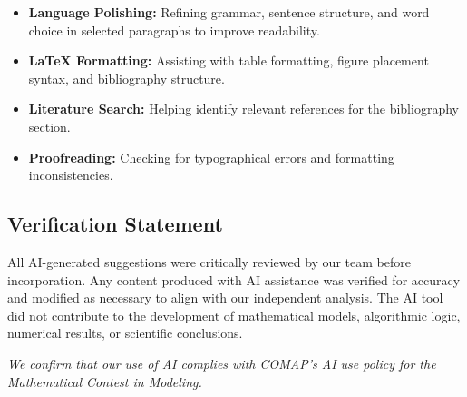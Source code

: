 \documentclass[12pt]{article}
\begin{document}
\begin{itemize}[leftmargin=2em, itemsep=2pt]
	\item \textbf{Language Polishing:} Refining grammar, sentence structure, and word choice in selected paragraphs to improve readability.
	\item \textbf{LaTeX Formatting:} Assisting with table formatting, figure placement syntax, and bibliography structure.
	\item \textbf{Literature Search:} Helping identify relevant references for the bibliography section.
	\item \textbf{Proofreading:} Checking for typographical errors and formatting inconsistencies.
\end{itemize}

\subsection*{Verification Statement}
All AI-generated suggestions were critically reviewed by our team before incorporation. Any content produced with AI assistance was verified for accuracy and modified as necessary to align with our independent analysis. The AI tool did not contribute to the development of mathematical models, algorithmic logic, numerical results, or scientific conclusions.

\vspace{0.5cm}
\noindent\textit{We confirm that our use of AI complies with COMAP's AI use policy for the Mathematical Contest in Modeling.}
\end{document}
